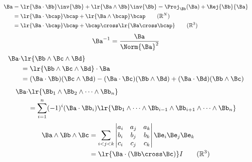 \begin{equation}\label{eqn:helpful:140}
\begin{aligned}
\Ba
&= \lr{ \Ba \cdot \Bb} \inv{\Bb} + \lr{ \Ba \wedge \Bb} \inv{\Bb} = \Proj_\Bb(\Ba) + \Rej{\Bb}{\Ba} \\
&= \lr{ \Ba \cdot \bcap} \bcap + \lr{ \Ba \wedge \bcap} \bcap \qquad (\mathbb{R}^N) \\
&= \lr{ \Ba \cdot \bcap} \bcap + \bcap \cross \lr{ \Ba \cross \bcap}\qquad (\mathbb{R}^3) \\
\end{aligned}
\end{equation}
\begin{equation}\label{eqn:helpful:160}
\Ba^{-1} = \frac{\Ba}{\Norm{\Ba}^2}
\end{equation}
\begin{equation}\label{eqn:helpful:180}
\begin{aligned}
\Ba \cdot &\lr{ \Bb \wedge \Bc \wedge \Bd} \\
&=
\lr{ \Bb \wedge \Bc \wedge \Bd} \cdot \Ba \\
&=
( \Ba \cdot \Bb ) (\Bc \wedge \Bd)
-( \Ba \cdot \Bc ) (\Bb \wedge \Bd)
+( \Ba \cdot \Bd ) (\Bb \wedge \Bc)
\end{aligned}
\end{equation}
\begin{equation}\label{eqn:helpful:200}
\begin{aligned}
\Ba \cdot &\lr{ \Bb_1 \wedge \Bb_2 \wedge \cdots \wedge \Bb_n } \\
&=
\sum_{i = 1}^n (-1)^i (\Ba \cdot \Bb_i) \lr{ \Bb_1 \wedge \cdots \wedge \Bb_{i-1} \wedge \Bb_{i+1} \wedge \cdots \wedge \Bb_n }
\end{aligned}
\end{equation}
\begin{equation}\label{eqn:helpful:81}
\begin{aligned}
\Ba \wedge \Bb \wedge \Bc
&=
\sum_{i < j < k}
\begin{vmatrix}
a_i & a_j & a_k \\
b_i & b_j & b_k \\
c_i & c_j & c_k \\
\end{vmatrix}
\Be_i \Be_j \Be_k \\
&= \lr{ \Ba \cdot (\Bb \cross \Bc) } I\qquad (\mathbb{R}^3)
\end{aligned}
\end{equation}
